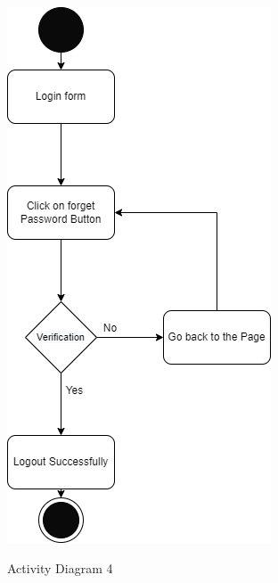 \begin{figure}[H]
    \centering
    \caption{Activity Diagram 4}
    \includegraphics[scale=0.5]{./diagrams/Activity Diagram/ad-04.png}
    \label{fig:act-04}

\end{figure}


